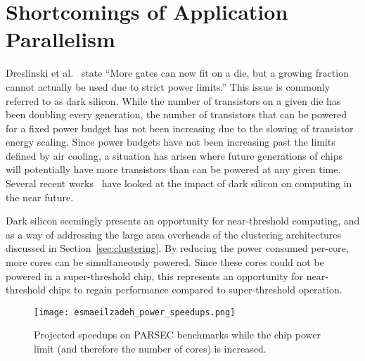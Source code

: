 \section{Shortcomings of Application Parallelism} \label{sec:darksilicon}

Dreslinski et al.~\cite{dreslinski2010near} state ``More gates can now fit on a
die, but a growing fraction cannot actually be used due to strict power
limits.'' This issue is commonly referred to as dark silicon.  While the number
of transistors on a given die has been doubling every generation, the number of
transistors that can be powered for a fixed power budget has not been increasing
due to the slowing of transistor energy scaling. Since power budgets have not
been increasing past the limits defined by air cooling, a situation has arisen
where future generations of chips will potentially have more transistors than
can be powered at any given time.  Several recent
works~\cite{Esmaeilzadeh2011Dark-silicon-an,Hardavellas:2011de} have looked at
the impact of dark silicon on computing in the near future. 

Dark silicon seemingly presents an opportunity for near-threshold computing, and
as a way of addressing the large area overheads of the clustering architectures
discussed in Section~\ref{sec:clustering}. By reducing the power consumed
per-core, more cores can be simultaneously powered. Since these cores could not
be powered in a super-threshold chip, this represents an opportunity for
near-threshold chips to regain performance compared to super-threshold
operation.

\begin{figure}[thpb] \centering
\texttt{[image: esmaeilzadeh\_power\_speedups.png]}
\caption{Projected speedups on PARSEC benchmarks while the chip power limit (and
therefore the number of cores) is
increased.~\cite{Esmaeilzadeh2011Dark-silicon-an}} \label{fig:power_speedups}
\end{figure}

